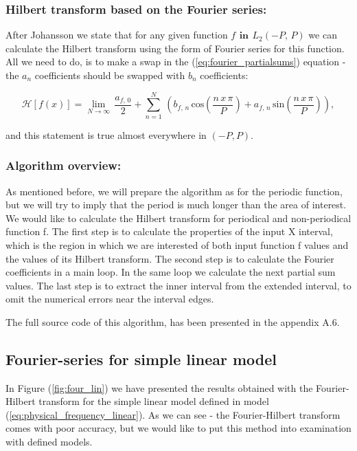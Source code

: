 \documentclass[12pt,twoside,a4paper]{article}
\numberwithin{equation}{subsection}
\numberwithin{figure}{subsection}
\begin{document}
\subsubsection*{Hilbert transform based on the Fourier series:}

After Johansson \cite{johansson_hilbert} we state that for any given function $f\,\ \textbf{in}\ \,{L_{2}}( - P, \,P)$ we can
calculate the Hilbert transform using the form of Fourier series for this function. All we need to do, is to make a swap in the
(\ref{eq:fourier_partialsums}) equation - the ${a_{n}}$ coefficients should be swapped with ${b_{n}}$ coefficients:

\begin{equation} \label{eq:fourier_hilbert}
	\mathcal{H}[f(x)] = \lim_{N\rightarrow \infty } \, \frac {{a_{f, \, 0}}}{2}  + \sum_{ n=1}^{N} \, 
		\left(
	  		  {b_{f, \,n}} \, \mathrm{cos}(\frac{n \, x\, \pi}{P}) 
			+ {a_{f, \,n}} \, \mathrm{sin}(\frac{n \, x\, \pi}{P})
		\right),
\end{equation}

and this statement is true almost everywhere in $(-P, P)$.

\subsubsection*{Algorithm overview:}

As mentioned before, we will prepare the algorithm as for the periodic function, but we will try to imply that the period is much longer
than the area of interest. We would like to calculate the Hilbert transform for periodical and non-periodical function f. The first step is
to calculate the properties of the input X interval, which is the region in which we are interested of both input function f values and the
values of its Hilbert transform. The second step is to calculate the Fourier coefficients in a main loop. In the same loop we calculate the
next partial sum values. The last step is to extract the inner interval from the extended interval, to omit the numerical errors near the
interval edges.

The full source code of this algorithm, has been presented in the appendix A.6.

\subsection{Fourier-series for simple linear model} \label{chap:fourier_lin}

In Figure (\ref{fig:four_lin}) we have presented the results obtained with the Fourier-Hilbert transform for the simple
linear model defined in model (\ref{eq:physical_frequency_linear}). As we can see - the Fourier-Hilbert transform comes with poor accuracy,
but we would like to put this method into examination with defined models.
\end{document}
